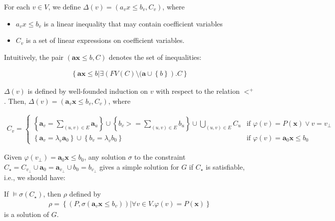\documentclass[a4paper,12pt]{article}
\begin{document}
For each $v \in V$, we define $\Delta(v) = (a_v x \leq b_v, C_v)$,
where
\begin{itemize}
\item $a_v x \leq b_v$ is a linear inequality that may contain
  coefficient variables
\item $C_v$ is a set of linear expressions on coefficient variables.
\end{itemize}
Intuitively, the pair $(\mathbf{a} \mathbf{x} \leq b, C)$ denotes the
set of inequalities:

\begin{align*}
\left\lbrace
 \mathbf{a} \mathbf{x} \leq b |
 \exists \left( FV(C)
  \setminus (\mathbf{a} \cup \left\lbrace b \right\rbrace
 \right). C
\right\rbrace
\end{align*}

$\Delta(v)$ is defined by well-founded induction on $v$ with respect
to the relation $<^+$. Then,
$\Delta(v) = \left( \mathbf{a}_v \mathbf{x} \leq b_v, C_v \right)$,
where

\begin{align*}
C_v =
\begin{cases}
\left\lbrace \mathbf{a}_v = \sum_{(u,v) \in E} \mathbf{a}_u \right\rbrace \cup
\left\lbrace b_v >= \sum_{(u,v) \in E} b_u \right\rbrace \cup
\bigcup_{(u,v) \in E} C_u
& \mbox{if } \varphi(v) = P(\mathbf{x}) \vee v = v_\bot \\
\left\lbrace \mathbf{a}_v = \lambda_v \mathbf{a}_0 \right\rbrace \cup
\left\lbrace b_v = \lambda_v b_0 \right\rbrace
& \mbox{if } \varphi(v) = \mathbf{a}_0 \mathbf{x} \leq b_0
\end{cases}
\end{align*}

Given $\varphi(v_\bot) = \mathbf{a}_0 \mathbf{x} \leq b_0$, any
solution $\sigma$ to the constraint $C_\star = C_{v_\bot} \cup {
  \mathbf{a}_0 = \mathbf{a}_{v_\bot} } \cup { b_0 = b_{v_\bot} }$
gives a simple solution for $G$ if $C_\star$ is satisfiable, i.e., we
should have:

\quote
If $\models \sigma(C_\star)$, then $\rho$ defined by
\begin{align*}
 \rho = \left\lbrace
  \left( P, \sigma(\mathbf{a}_v \mathbf{x} \leq b_v) \right) |
  \forall v \in V. \varphi(v) = P(\mathbf{x})
 \right\rbrace
\end{align*}
is a solution of $G$.
\endquote
\end{document}
